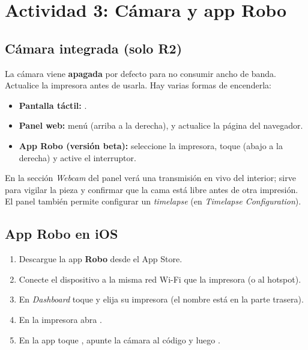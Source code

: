 \newpage
\section{Actividad 3: Cámara y app Robo}

\subsection*{Cámara integrada (solo R2)}

La cámara viene \textbf{apagada} por defecto para no consumir ancho de banda. Actualice la impresora antes de usarla. Hay varias formas de encenderla:

\begin{itemize}
    \item \textbf{Pantalla táctil:} \flecha{}\flecha{}.
    \item \textbf{Panel web:} menú  (arriba a la derecha)\flecha{}, y actualice la página del navegador.
    \item \textbf{App Robo (versión beta):} seleccione la impresora, toque  (abajo a la derecha) y active el interruptor.
\end{itemize}

En la sección \emph{Webcam} del panel verá una transmisión en vivo del interior; sirve para vigilar la pieza y confirmar que la cama está libre antes de otra impresión. El panel también permite configurar un \emph{timelapse} (en \emph{Timelapse Configuration}).

\subsection*{App Robo en iOS}

\begin{enumerate}
    \item Descargue la app \textbf{Robo} desde el App Store.
    \item Conecte el dispositivo a la misma red Wi-Fi que la impresora (o al hotspot).
    \item En \emph{Dashboard} toque \flecha{} y elija su impresora (el nombre está en la parte trasera).
    \item En la impresora abra \flecha{}\flecha{}.
    \item En la app toque , apunte la cámara al código y luego .
\end{enumerate}

